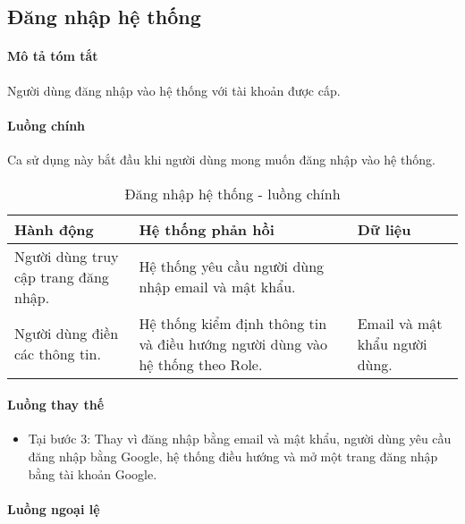 \documentclass[./../main.tex]{subfiles}
\begin{document}
\subsection{Đăng nhập hệ thống}

\paragraph*{Mô tả tóm tắt}

Người dùng đăng nhập vào hệ thống với tài khoản được cấp.

\paragraph*{Luồng chính} Ca sử dụng này bắt đầu khi người dùng mong muốn đăng
nhập vào hệ thống.

\begin{table}[H]
    \caption{Đăng nhập hệ thống - luồng chính}
    \label{tab:login_flow_main}
	\begin{tabularx}{\textwidth}{|X|X|X|}
		\hline
		\textbf{Hành động}                         & \textbf{Hệ thống phản hồi}                                                                      & \textbf{Dữ liệu}                   \\ \hline
		Người dùng truy cập trang đăng nhập. & Hệ thống yêu cầu người dùng nhập email và mật khẩu.                                   &                                        \\ \hline
		Người dùng điền các thông tin.        & Hệ thống kiểm định thông tin và điều hướng người dùng vào hệ thống theo Role. & Email và mật khẩu người dùng. \\ \hline
	\end{tabularx}
\end{table}

\paragraph*{Luồng thay thế}

\begin{itemize}
	\item
	      	Tại bước 3: Thay vì đăng nhập bằng email và mật khẩu, người dùng yêu
	      	cầu đăng nhập bằng Google, hệ thống điều hướng và mở một trang đăng
	      	nhập bằng tài khoản Google.
\end{itemize}

\paragraph*{Luồng ngoại lệ}
\end{document}

